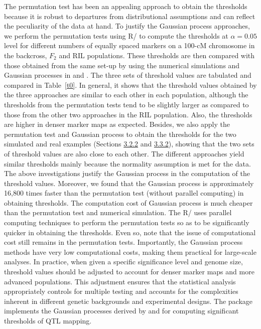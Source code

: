 The permutation test has been an appealing approach to obtain the thresholds because it is robust to departures from distributional assumptions and can reflect the peculiarity of the data at hand. To justify the Gaussian process approaches, we perform the permutation tests using R/ to compute the thresholds at $\alpha=0.05$ level for different numbers of equally spaced markers on a 100-cM chromosome in the backcross, $F_2$ and RIL populations. These thresholds are then compared with those obtained from the same set-up by using the numerical simulations and Gaussian processes in \citet{Guo-2011} and \citet{Kao-2012}. The three sets of threshold values are tabulated and compared in Table~\ref{t0}. In general, it shows that the threshold values obtained by the three approaches are similar to each other in each population, although the thresholds from the permutation tests tend to be slightly larger as compared to those from the other two approaches in the RIL population. Also, the thresholds are higher in denser marker maps as expected. Besides, we also apply the permutation test and Gaussian process to obtain the thresholds for the two simulated and real examples (Sections \hyperref[3.2.2]{3.2.2} and \hyperref[3.3.2]{3.3.2}), showing that the two sets of threshold values are also close to each other. The different approaches yield similar thresholds mainly because the normality assumption is met for the data. The above investigations justify the Gaussian process in the computation of the threshold values. Moreover, we found that the Gaussian process is approximately 16,800 times faster than the permutation test (without parallel computing) in obtaining thresholds. The computation cost of Gaussian process is much cheaper than the permutation test and numerical simulation. The R/ uses parallel computing techniques to perform the permutation tests so as to be significantly quicker in obtaining the thresholds. Even so, note that the issue of computational cost still remains in the permutation tests. Importantly, the Gaussian process methods have very low computational costs, making them practical for large-scale analyses. In practice, when given a specific significance level and genome size, threshold values should be adjusted to account for denser marker maps and more advanced populations. This adjustment ensures that the statistical analysis appropriately controls for multiple testing and accounts for the complexities inherent in different genetic backgrounds and experimental designs. The  package implements the Gaussian processes derived by \citet{Guo-2011} and \citet{Kao-2012} for computing significant thresholds of QTL mapping. 

